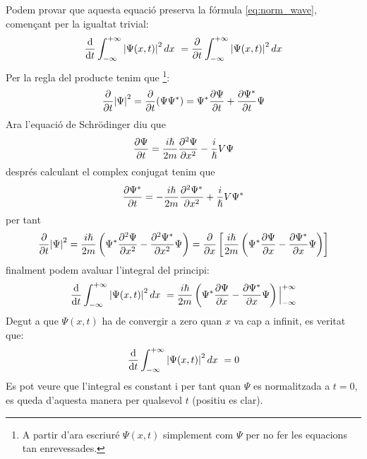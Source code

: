 Podem provar que aquesta equació preserva la fórmula \ref{eq:norm_wave}, començant per la igualtat trivial:
$$
\dv{t} \int_{-\infty}^{+\infty}\abs{\Psi(x,t)}^2\, dx\ = \pdv{t} \int_{-\infty}^{+\infty}\abs{\Psi(x,t)}^2\, dx
$$
Per la regla del producte tenim que \footnote{A partir d'ara escriuré  $\Psi(x,t)$ simplement com $\Psi$ per no fer les equacions tan enrevessades.}:
$$
\pdv{t}\abs{\Psi}^2 = \pdv{t}(\Psi\Psi^*) = \Psi^*\pdv{\Psi}{t} + \pdv{\Psi^*}{t}\Psi
$$
Ara l'equació de Schrödinger diu que
$$
\pdv{\Psi}{t} = \frac{i\hslash}{2m}\pdv[2]{\Psi}{x} -  \frac{i}{\hslash}V\Psi
$$
després calculant el complex conjugat tenim que 
$$
\pdv{\Psi^*}{t} = - \frac{i\hslash}{2m}\pdv[2]{\Psi^*}{x} + \frac{i}{\hslash}V\Psi^*
$$
per tant
$$
\pdv{t}\abs{\Psi}^2 = \frac{i\hslash}{2m} \left( \Psi^*\pdv[2]{\Psi}{x} - \pdv[2]{\Psi^*}{x}\Psi \right) = \pdv{x} \left[ \frac{i\hslash}{2m} \left(\Psi^*\pdv{\Psi}{x} - \pdv{\Psi^*}{x}\Psi\right)\right]
$$
finalment podem avaluar l'integral del principi:
$$
\dv{t} \int_{-\infty}^{+\infty}\abs{\Psi(x,t)}^2\, dx\ = \frac{i\hslash}{2m} \left( \Psi^*\pdv{\Psi}{x} - \pdv{\Psi^*}{x}\Psi \right) \Big|_{-\infty}^{+\infty}
$$
Degut a que $\Psi(x,t)$ ha de convergir a zero quan $x$ va cap a infinit, es veritat que:
$$
\dv{t} \int_{-\infty}^{+\infty}\abs{\Psi(x,t)}^2\, dx\ = 0
$$
Es pot veure que l'integral es constant i per tant quan $\Psi$ es normalitzada a $t=0$, es queda d'aquesta manera per qualsevol $t$ (positiu es clar). 

